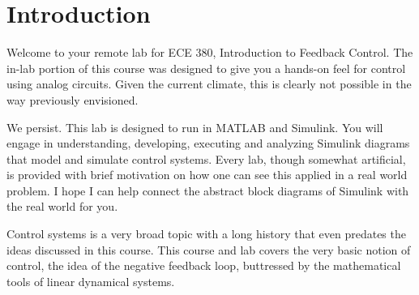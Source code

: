 \chapter{Introduction}
Welcome to your remote lab for ECE 380, Introduction to Feedback Control.
The in-lab portion of this course was designed to give you a hands-on
feel for control using analog circuits. Given the current climate, this is
clearly not possible in the way previously envisioned.

We persist. This lab is designed to run in MATLAB and Simulink. You will engage
in understanding, developing, executing and analyzing Simulink
diagrams that model and simulate control systems. Every lab, though
somewhat artificial, is
provided with brief motivation on how one can see this applied in a real
world problem. I hope I can help connect the abstract block diagrams of
Simulink with the real world for you.

Control systems is a very broad topic with a long history that even predates
the ideas discussed in this course. This course and lab covers the very basic
notion of control, the idea of the negative feedback loop, buttressed by
the mathematical tools of linear dynamical systems.

